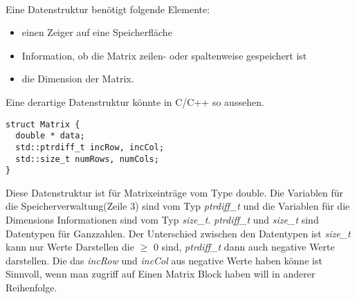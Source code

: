 \\


Eine Datenstruktur benötigt folgende Elemente:
\begin{itemize}
	\item einen Zeiger auf eine Speicherfläche
	\item Information, ob die Matrix zeilen- oder spaltenweise gespeichert ist 
	\item die Dimension der Matrix.
\end{itemize}


Eine derartige Datenstruktur könnte in C/C++ so aussehen.
\begin{lstlisting}
struct Matrix {
  double * data;
  std::ptrdiff_t incRow, incCol;
  std::size_t numRows, numCols;
}
\end{lstlisting}

Diese Datenstruktur ist für Matrixeinträge vom Type double.
Die Variablen für die Speicherverwaltung(Zeile 3) sind vom Typ \textit{ptrdiff\_t} und die Variablen für die Dimensions Informationen sind vom Typ \textit{size\_t}.
\textit{ptrdiff\_t} und \textit{size\_t} sind Datentypen für Ganzzahlen. Der Unterschied zwischen den Datentypen ist \textit{size\_t} kann nur Werte Darstellen die $\geq$ 0 sind, \textit{ptrdiff\_t} dann auch negative Werte darstellen.
Die das \textit{incRow} und \textit{incCol} aus negative Werte haben könne ist Sinnvoll, wenn man zugriff auf Einen Matrix Block haben will in anderer Reihenfolge. \cite{blast}

